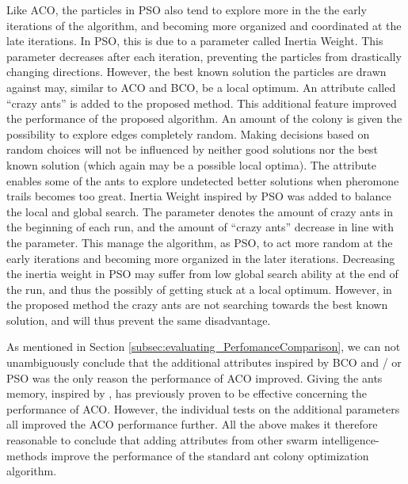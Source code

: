 Like ACO, the particles in PSO also tend to explore more in the the early iterations of the algorithm, and becoming more organized and coordinated at the late iterations. In PSO, this is due to a parameter called  Inertia Weight. This parameter decreases after each iteration, preventing the particles from drastically changing directions. However, the best known solution the particles are drawn against may, similar to ACO and BCO, be a local optimum. An attribute called ``crazy ants'' is added to the proposed method. This additional feature improved the performance of the proposed algorithm. An amount of the colony is given the possibility to explore edges completely random. Making decisions based on random choices will not be influenced by neither good solutions nor the best known solution (which again may be a possible local optima). The attribute enables some of the ants to explore undetected better solutions when pheromone trails becomes too great. Inertia Weight inspired by PSO was added to balance the local and global search. The parameter denotes the amount of crazy ants in the beginning of each run, and the amount of ``crazy ants'' decrease in line with the parameter. This manage the algorithm, as PSO, to act more random at the early iterations and becoming more organized in the later iterations. Decreasing the inertia weight in PSO may suffer from low global search ability at the end of the run, and thus the possibly of getting stuck at a local optimum. However, in the proposed method the crazy ants are not searching towards the best known solution, and will thus prevent the same disadvantage.

As mentioned in Section \vref{subsec:evaluating_PerfomanceComparison}, we can not unambiguously conclude that the additional attributes inspired by BCO and / or PSO was the only reason the performance of ACO improved. Giving the ants memory, inspired by \citet{dorigo96}, has previously proven to be effective concerning the performance of ACO. However, the individual tests on the additional parameters all improved the ACO performance further. All the above makes it therefore reasonable to conclude that adding attributes from other swarm intelligence-methods improve the performance of the standard ant colony optimization algorithm.


